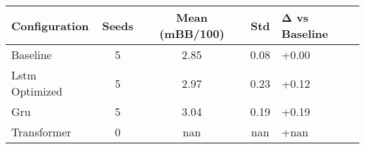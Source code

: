 \begin{tabular}{lcccl}
\toprule
Configuration & Seeds & Mean (mBB/100) & Std & Δ vs Baseline \\
\midrule
Baseline & 5 & 2.85 & 0.08 & +0.00 \\
Lstm Optimized & 5 & 2.97 & 0.23 & +0.12 \\
Gru & 5 & 3.04 & 0.19 & +0.19 \\
Transformer & 0 & nan & nan & +nan \\
\bottomrule
\end{tabular}
